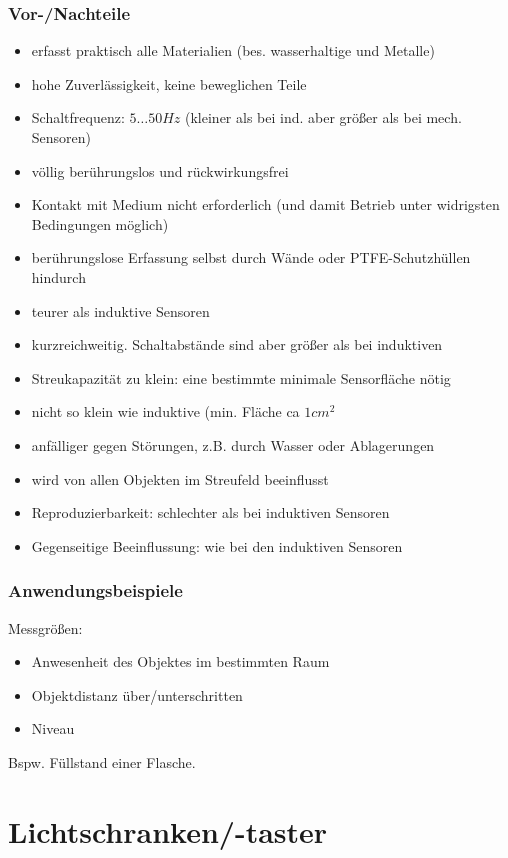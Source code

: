 \documentclass{scrreprt}
\begin{document}
\subsubsection{Vor-/Nachteile}
\begin{itemize}[label=$+$]
\item erfasst praktisch alle Materialien (bes. wasserhaltige und Metalle)
\item hohe Zuverlässigkeit, keine beweglichen Teile
\item Schaltfrequenz: $5\ldots 50 \unit{Hz}$ (kleiner als bei ind. aber größer als bei mech. Sensoren)
\item völlig berührungslos  und rückwirkungsfrei
\item Kontakt mit Medium nicht erforderlich (und damit Betrieb unter widrigsten Bedingungen möglich)
\item berührungslose Erfassung selbst durch Wände oder PTFE-Schutzhüllen hindurch
\end{itemize}
\begin{itemize}[label=$-$]
\item teurer als induktive Sensoren
\item kurzreichweitig. Schaltabstände sind aber größer als bei induktiven
\item Streukapazität zu klein: eine bestimmte minimale Sensorfläche nötig
\item nicht so klein wie induktive (min. Fläche ca $1\unit{cm^2}$
\item anfälliger gegen Störungen, z.B. durch Wasser oder Ablagerungen
\item wird von allen Objekten im Streufeld beeinflusst
\item Reproduzierbarkeit: schlechter als bei induktiven Sensoren
\item Gegenseitige Beeinflussung: wie bei den induktiven Sensoren
\end{itemize}
\subsubsection{Anwendungsbeispiele}
Messgrößen:
\begin{itemize}
\item Anwesenheit des Objektes im bestimmten Raum
\item Objektdistanz über/unterschritten
\item Niveau
\end{itemize}
Bspw. Füllstand einer Flasche.

\section{Lichtschranken/-taster}
\end{document}
